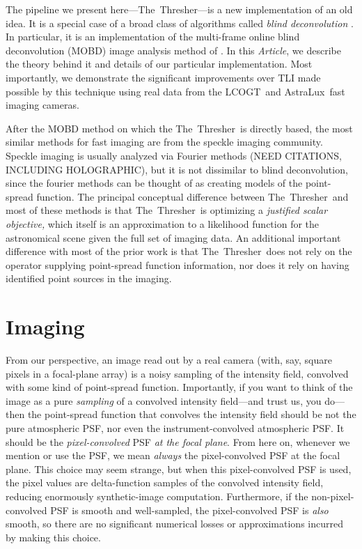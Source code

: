\documentclass[12pt,preprint]{aastex}
\newcommand{\project}[1]{{\sffamily #1}}
\newcommand{\TheThresher}{\project{The~Thresher}}
\newcommand{\LCOGT}{\project{LCOGT}}
\newcommand{\AstraLux}{\project{AstraLux}}
\newcommand{\documentname}{\textsl{Article}}
\newcommand{\sectlabel}[1]{\label{sect:#1}}
\begin{document}
The pipeline we present here---\TheThresher---is a new implementation
of an old idea.  It is a special case of a broad class of algorithms
called \emph{blind deconvolution} \citep{ayers}.  In particular, it is
an implementation of the multi-frame online blind deconvolution (MOBD)
image analysis method of \citet{hirsch}. In this \documentname, we
describe the theory behind it and details of our particular
implementation.  Most importantly, we demonstrate the significant
improvements over TLI made possible by this technique using real data
from the \LCOGT\ and \AstraLux\ fast imaging cameras.

After the MOBD method on which the \TheThresher\ is directly based,
the most similar methods for fast imaging are from the speckle imaging
community.  Speckle imaging is usually analyzed via Fourier methods
(NEED CITATIONS, INCLUDING HOLOGRAPHIC), but it is not dissimilar to
blind deconvolution, since the fourier methods can be thought of as
creating models of the point-spread function.  The principal
conceptual difference between \TheThresher\ and most of these methods
is that \TheThresher\ is optimizing a \emph{justified scalar
  objective,} which itself is an approximation to a likelihood
function for the astronomical scene given the full set of imaging
data.  An additional important difference with most of the prior work
is that \TheThresher\ does not rely on the operator supplying
point-spread function information, nor does it rely on having
identified point sources in the imaging.

\section{Imaging} \sectlabel{imaging}

From our perspective, an image read out by a real camera (with, say,
square pixels in a focal-plane array) is a noisy sampling of the
intensity field, convolved with some kind of point-spread function.
Importantly, if you want to think of the image as a pure
\emph{sampling} of a convolved intensity field---and trust us, you
do---then the point-spread function that convolves the intensity field
should be not the pure atmospheric PSF, nor even the
instrument-convolved atmospheric PSF\@.  It should be the
\emph{pixel-convolved} PSF \emph{at the focal plane}.  From here on,
whenever we mention or use the PSF, we mean \emph{always} the
pixel-convolved PSF at the focal plane.  This choice may seem strange,
but when this pixel-convolved PSF is used, the pixel values are
delta-function samples of the convolved intensity field, reducing
enormously synthetic-image computation.  Furthermore, if the
non-pixel-convolved PSF is smooth and well-sampled, the
pixel-convolved PSF is \emph{also} smooth, so there are no significant
numerical losses or approximations incurred by making this choice.
\end{document}
